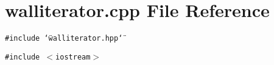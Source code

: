 \section{walliterator.cpp File Reference}
\label{walliterator_8cpp}
{\tt \#include \char`\"{}walliterator.hpp\char`\"{}}\par
{\tt \#include $<$iostream$>$}\par
